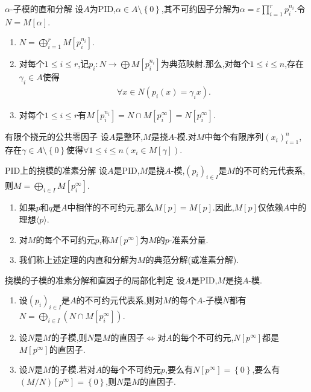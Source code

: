 \begin{lemma}{$\alpha$-子模的直和分解}{}
	设$A$为PID,$\alpha\in A\setminus\left\{0\right\}$,其不可约因子分解为$\alpha=\varepsilon\prod\limits_{i=1}^{r}p_{i}^{n_{i}}$.令$N=M[\alpha]$.
	\begin{enumerate}
		\item $N=\bigoplus\limits_{i=1}^{r}M\left[p_{i}^{n_{i}}\right]$.
		\item 对每个$1\leq i\leq r$,记$p_{i}:N\to\bigoplus M[p_{i}^{n_{i}}]$为典范映射.那么,对每个$1\leq i\leq n$,存在$\gamma_{i}\in A$使得
		\begin{align*}
			\forall x\in N\left(p_{i}\left(x\right)=\gamma_{i}x\right).
		\end{align*}
		\item 对每个$1\leq i\leq r$有$M[p_{i}^{n_{i}}]=N\cap M\left[p_{i}^{\infty}\right]=N[p_{i}^{\infty}]$.
	\end{enumerate}
\end{lemma}

\begin{lemma}{有限个挠元的公共零因子}{}
	设$A$是整环,$M$是挠$A$-模.对$M$中每个有限序列$\left(x_{i}\right)_{i=1}^{n}$,存在$\gamma\in A\setminus\left\{0\right\}$使得$\forall 1\leq i\leq n\left(x_{i}\in M[\gamma]\right)$.
\end{lemma}

\begin{theorem}{PID上的挠模的准素分解}{}
	设$A$是PID,$M$是挠$A$-模,$\left(p_{i}\right)_{i\in I}$是$M$的不可约元代表系,则$M=\bigoplus\limits_{i\in I}M[p_{i}^{\infty}]$.
\end{theorem}

\begin{remark}{}{}
	\begin{enumerate}
		\item 如果$p$和$q$是$A$中相伴的不可约元,那么$M[p]=M[p]$.因此,$M[p]$仅依赖$A$中的理想$\langle p\rangle$.
		\item 对$M$的每个不可约元$p$,称$M[p^{\infty}]$为$M$的$p$-准素分量.
		\item 我们称上述定理的内直和分解为$M$的典范分解(或准素分解).
	\end{enumerate}
\end{remark}

\begin{corollary}{挠模的子模的准素分解和直因子的局部化判定}{}
	设$A$是PID,$M$是挠$A$-模.
	\begin{enumerate}
		\item 设$\left(p_{i}\right)_{i\in I}$是$A$的不可约元代表系,则对$M$的每个$A$-子模$N$都有$N=\bigoplus\limits_{i\in I}\left(N\cap M[p_{i}^{\infty}]\right)$.
		\item 设$N$是$M$的子模,则$N$是$M$的直因子$\iff$对$A$的每个不可约元,$N[p^{\infty}]$都是$M[p^{\infty}]$的直因子.
		\item 设$N$是$M$的子模.若对$A$的每个不可约元$p$,要么有$N[p^{\infty}]=\left\{0\right\}$,要么有$(M/N)[p^{\infty}]=\left\{0\right\}$,则$N$是$M$的直因子.
	\end{enumerate}
\end{corollary}

